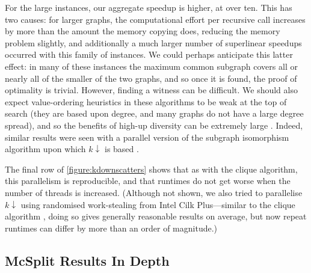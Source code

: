 \documentclass{llncs}
\begin{document}
For the large instances, our aggregate speedup is higher, at over ten. This has two causes: for
larger graphs, the computational effort per recursive call increases by more than the amount the
memory copying does, reducing the memory problem slightly, and additionally a much larger
number of superlinear speedups occurred with this family of instances. We could perhaps anticipate
this latter effect: in many of these instances the maximum common subgraph covers all or nearly all
of the smaller of the two graphs, and so once it is found, the proof of optimality is trivial.
However, finding a witness can be difficult. We should also expect value-ordering heuristics in
these algorithms to be weak at the top of search (they are based upon degree, and many graphs do not
have a large degree spread), and so the benefits of high-up diversity can be extremely large
\cite{DBLP:conf/ijcai/HarveyG95,DBLP:conf/cp/ChuSS09,DBLP:journals/topc/McCreeshP15}. Indeed,
similar results were seen with a parallel version of the subgraph isomorphism algorithm upon which
$k{\downarrow}$ is based \cite{DBLP:conf/cp/McCreeshP15}.

The final row of \cref{figure:kdownscatters} shows that as with the clique algorithm, this
parallelism is reproducible, and that runtimes do not get worse when the number of threads is
increased. (Although not shown, we also tried to parallelise $k{\downarrow}$ using randomised
work-stealing from Intel Cilk Plus---similar to the clique algorithm
\cite{DBLP:journals/topc/McCreeshP15}, doing so gives generally reasonable results on average, but
now repeat runtimes can differ by more than an order of magnitude.)

\subsection{McSplit Results In Depth}
\end{document}
